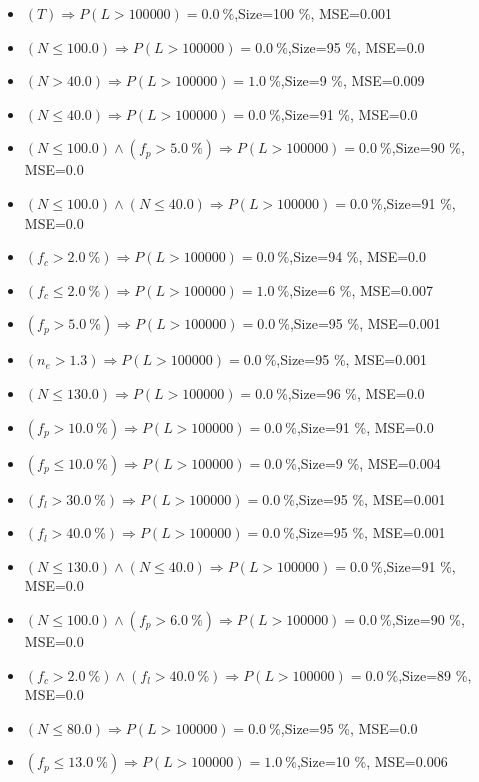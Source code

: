 \documentclass[numbered]{CSL}
\begin{document}
\begin{itemize}
\item $(T) \Rightarrow P(L > 100 000) = 0.0~\%$,\hfill Size=100 \%, MSE=0.001
\item $(N \leq 100.0) \Rightarrow P(L > 100 000) = 0.0~\%$,\hfill Size=95 \%, MSE=0.0
\item $(N > 40.0) \Rightarrow P(L > 100 000) = 1.0~\%$,\hfill Size=9 \%, MSE=0.009
\item $(N \leq 40.0) \Rightarrow P(L > 100 000) = 0.0~\%$,\hfill Size=91 \%, MSE=0.0
\item $(N \leq 100.0) \land (f_p > 5.0~\%) \Rightarrow P(L > 100 000) = 0.0~\%$,\hfill Size=90 \%, MSE=0.0
\item $(N \leq 100.0) \land (N \leq 40.0) \Rightarrow P(L > 100 000) = 0.0~\%$,\hfill Size=91 \%, MSE=0.0
\item $(f_c > 2.0~\%) \Rightarrow P(L > 100 000) = 0.0~\%$,\hfill Size=94 \%, MSE=0.0
\item $(f_c \leq 2.0~\%) \Rightarrow P(L > 100 000) = 1.0~\%$,\hfill Size=6 \%, MSE=0.007
\item $(f_p > 5.0~\%) \Rightarrow P(L > 100 000) = 0.0~\%$,\hfill Size=95 \%, MSE=0.001
\item $(n_e > 1.3) \Rightarrow P(L > 100 000) = 0.0~\%$,\hfill Size=95 \%, MSE=0.001
\item $(N \leq 130.0) \Rightarrow P(L > 100 000) = 0.0~\%$,\hfill Size=96 \%, MSE=0.0
\item $(f_p > 10.0~\%) \Rightarrow P(L > 100 000) = 0.0~\%$,\hfill Size=91 \%, MSE=0.0
\item $(f_p \leq 10.0~\%) \Rightarrow P(L > 100 000) = 0.0~\%$,\hfill Size=9 \%, MSE=0.004
\item $(f_l > 30.0~\%) \Rightarrow P(L > 100 000) = 0.0~\%$,\hfill Size=95 \%, MSE=0.001
\item $(f_l > 40.0~\%) \Rightarrow P(L > 100 000) = 0.0~\%$,\hfill Size=95 \%, MSE=0.001
\item $(N \leq 130.0) \land (N \leq 40.0) \Rightarrow P(L > 100 000) = 0.0~\%$,\hfill Size=91 \%, MSE=0.0
\item $(N \leq 100.0) \land (f_p > 6.0~\%) \Rightarrow P(L > 100 000) = 0.0~\%$,\hfill Size=90 \%, MSE=0.0
\item $(f_c > 2.0~\%) \land (f_l > 40.0~\%) \Rightarrow P(L > 100 000) = 0.0~\%$,\hfill Size=89 \%, MSE=0.0
\item $(N \leq 80.0) \Rightarrow P(L > 100 000) = 0.0~\%$,\hfill Size=95 \%, MSE=0.0
\item $(f_p \leq 13.0~\%) \Rightarrow P(L > 100 000) = 1.0~\%$,\hfill Size=10 \%, MSE=0.006
\end{itemize}
\end{document}
